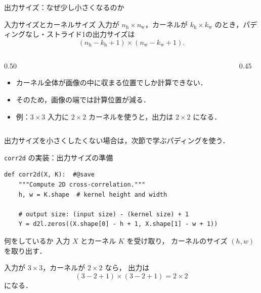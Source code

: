 \documentclass[dvipdfmx,uplatex,unicode,9pt,aspectratio=169]{beamer}
\begin{document}
\begin{frame}{出力サイズ：なぜ少し小さくなるのか}
\begin{block}{入力サイズとカーネルサイズ}
入力が $n_\mathrm{h}\times n_\mathrm{w}$，カーネルが $k_\mathrm{h}\times k_\mathrm{w}$ のとき，パディングなし・ストライド1の出力サイズは
\[
(n_\mathrm{h}-k_\mathrm{h}+1)\times(n_\mathrm{w}-k_\mathrm{w}+1).
\]
\end{block}

\begin{columns}[T,onlytextwidth]
\begin{column}{0.50\textwidth}
\begin{itemize}
  \item カーネル全体が画像の中に収まる位置でしか計算できない．
  \item そのため，画像の端では計算位置が減る．
  \item 例：$3\times3$ 入力に $2\times2$ カーネルを使うと，出力は $2\times2$ になる．
\end{itemize}
\end{column}
\begin{column}{0.45\textwidth}
\centering
{}
\end{column}
\end{columns}

\begin{seminaralertbox}
出力サイズを小さくしたくない場合は，次節で学ぶ\alert{パディング}を使う．
\end{seminaralertbox}
\end{frame}


\begin{frame}[fragile]{\texttt{corr2d} の実装：出力サイズの準備}
\begin{lstlisting}
def corr2d(X, K):  #@save
    """Compute 2D cross-correlation."""
    h, w = K.shape  # kernel height and width

    # output size: (input size) - (kernel size) + 1
    Y = d2l.zeros((X.shape[0] - h + 1, X.shape[1] - w + 1))
\end{lstlisting}

\begin{block}{何をしているか}
入力 $X$ とカーネル $K$ を受け取り，
カーネルのサイズ $(h,w)$ を取り出す．

入力が $3\times 3$，カーネルが $2\times 2$ なら，
出力は
\[
(3-2+1)\times(3-2+1)=2\times2
\]
になる．
\end{block}
\end{frame}
\end{document}
